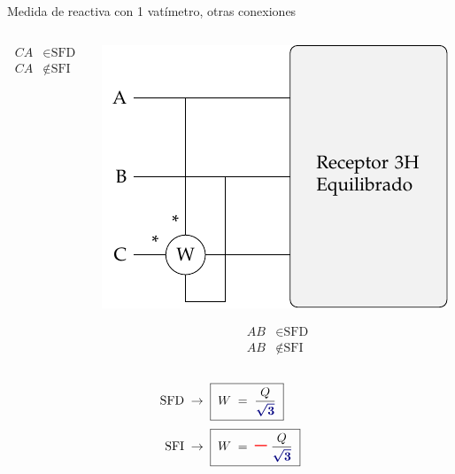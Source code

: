 \documentclass[aspectratio=169, usenames,svgnames,dvipsnames]{beamer}
\begin{document}
\begin{frame}{Medida de reactiva con 1 vatímetro, \hspace{3mm}otras conexiones}
\begin{columns}
\begin{column}{0.33\columnwidth}
        \vspace{-10mm}
        \begin{align*}
          CA &\in \text{SFD}\\
          CA &\notin \text{SFI}
        \end{align*}
    \end{column}
    \begin{column}{0.33\columnwidth}
        \begin{center}
            \includegraphics[width=.9\linewidth]{../figs/Reactiva3H_C-AB.pdf}
        \end{center}

        \vspace{-10mm}
        \begin{align*}
          AB &\in \text{SFD}\\
          AB &\notin \text{SFI}
        \end{align*}
    \end{column}
    \end{columns}
    \begin{align*}
        \text{SFD} & \;\rightarrow\; \boxed{\; W \;=\; \frac{Q}{\boldsymbol{\color{blue!50!black} \sqrt{3}}} \;}\\[3pt]
        \text{SFI} & \;\rightarrow\; \boxed{\; W \;=\,  {\Large\boldsymbol{\color{red} -}} \, \frac{Q}{\boldsymbol{\color{blue!50!black} \sqrt{3}}} \;}
    \end{align*}
\end{frame}

\end{document}
